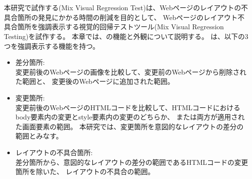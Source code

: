 \chapter{ \toolName}\label{cha:Function}
本研究で試作する\toolName (Mix Visual Regression Test)は、Webページのレイアウトの不具合箇所の発見にかかる時間の削減を目的として、
Webページのレイアウト不具合箇所を強調表示する視覚的回帰テストツール\toolName(Mix Visual Regression Testing)を試作する。
本章では、\toolName の機能と外観について説明する。
\toolName は、以下の3つを強調表示する機能を持つ。
\begin{itemize}
    \item 差分箇所:\\
          変更前後のWebページの画像を比較して、変更前のWebページから削除された範囲と、
          変更後のWebページに追加された範囲。
    \item 変更箇所:\\
          変更前後のWebページのHTMLコードを比較して、HTMLコードにおけるbody要素内の変更とstyle要素内の変更のどちらか、
          または両方が適用された画面要素の範囲。
          本研究では、変更箇所を意図的なレイアウトの差分の範囲とみなす。
    \item レイアウトの不具合箇所:\\
          差分箇所から、意図的なレイアウトの差分の範囲であるHTMLコードの変更箇所を除いた、
          レイアウトの不具合の範囲。
\end{itemize}
